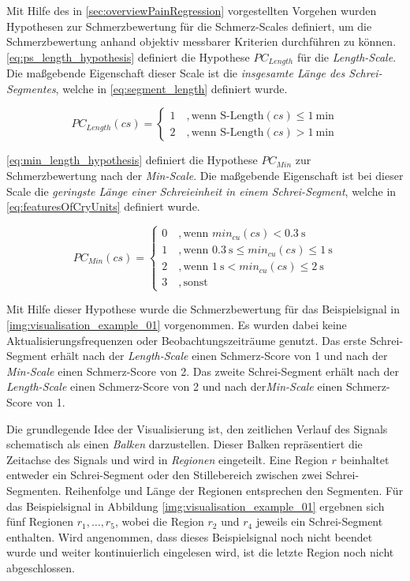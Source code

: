 Mit Hilfe des in \autoref{sec:overviewPainRegression} vorgestellten Vorgehen wurden Hypothesen zur Schmerzbewertung für die Schmerz-Scales definiert, um die Schmerzbewertung anhand objektiv messbarer Kriterien durchführen zu können. \autoref{eq:ps_length_hypothesis} definiert die Hypothese $PC_{Length}$ für die \emph{Length-Scale}. Die maßgebende Eigenschaft dieser Scale ist die \emph{insgesamte Länge des Schrei-Segmentes}, welche in \autoref{eq:segment_length} definiert wurde.

\begin{equation}
PC_{Length}(cs) = \begin{cases}
 1 \quad ,  \text{wenn } \text{S-Length}(cs) \leq \SI{1}{\minute} \\
 2 \quad ,  \text{wenn } \text{S-Length}(cs) > \SI{1}{\minute}
 \end{cases}	
 \label{eq:ps_length_hypothesis}
\end{equation}

\autoref{eq:min_length_hypothesis} definiert die Hypothese $PC_{Min}$ zur Schmerzbewertung nach der \emph{Min-Scale}. Die maßgebende Eigenschaft ist bei dieser Scale die \emph{geringste Länge einer Schreieinheit in einem Schrei-Segment}, welche in \autoref{eq:featuresOfCryUnits} definiert wurde.

\begin{equation}
PC_{Min}(cs) = \begin{cases}
 0 \quad ,  \text{wenn } min_{cu}(cs) < \SI{0.3}{\second}\\
 1 \quad ,  \text{wenn } \SI{0.3}{\second} \leq min_{cu}(cs) \leq \SI{1}{\second}\\
 2 \quad ,  \text{wenn } \SI{1}{\second} < min_{cu}(cs) \leq \SI{2}{\second} \\
 3 \quad , \text{sonst }
 \end{cases}	
 \label{eq:min_length_hypothesis}
\end{equation}

Mit Hilfe dieser Hypothese wurde die Schmerzbewertung für das Beispielsignal in \autoref{img:visualisation_example_01} vorgenommen. Es wurden dabei keine Aktualisierungsfrequenzen oder Beobachtungszeiträume genutzt. Das erste Schrei-Segment erhält nach der \emph{Length-Scale} einen Schmerz-Score von 1 und nach der \emph{Min-Scale} einen Schmerz-Score von 2. Das zweite Schrei-Segment erhält nach der \emph{Length-Scale} einen Schmerz-Score von 2 und nach der\emph{Min-Scale} einen Schmerz-Score von 1.

Die grundlegende Idee der Visualisierung ist, den zeitlichen Verlauf des Signals schematisch als einen \emph{Balken} darzustellen. Dieser Balken repräsentiert die Zeitachse des Signals und wird in \emph{Regionen} eingeteilt. Eine Region $r$ beinhaltet entweder ein Schrei-Segment oder den Stillebereich zwischen zwei Schrei-Segmenten. Reihenfolge und Länge der Regionen entsprechen den Segmenten. Für das Beispielsignal in Abbildung \ref{img:visualisation_example_01} ergebnen sich fünf Regionen $r_{1} , \ldots , r_5 $, wobei die Region $r_2$ und $r_4$ jeweils ein Schrei-Segment enthalten. Wird angenommen, dass dieses Beispielsignal noch nicht beendet wurde und weiter kontinuierlich eingelesen wird, ist die letzte Region noch nicht abgeschlossen.

